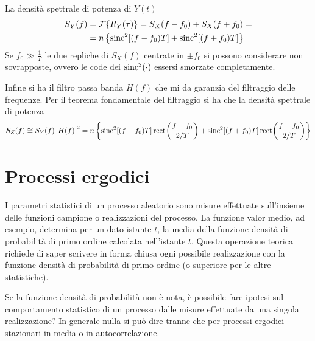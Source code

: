 La densità spettrale di potenza di $Y(t)$
\[\begin{split}S_Y(f)&=\operatorname{\mathcal{F}}\!\left\lbrace{R_Y(\tau)}\right\rbrace=S_X(f-f_0)+S_X(f+f_0)=\\&=n\left\lbrace\operatorname{sinc}^2[(f-f_0)T]+\operatorname{sinc}^2[(f+f_0)T]\right\rbrace\end{split}\]
Se $f_0\gg\frac{1}{T}$ le due repliche di $S_X(f)$ centrate in $\pm f_0$ si possono considerare non sovrapposte, ovvero le code dei $\operatorname{sinc}^2(\cdot)$ essersi smorzate completamente.

Infine si ha il filtro passa banda $H(f)$ che mi da garanzia del filtraggio delle frequenze. Per il teorema fondamentale del filtraggio si ha che la densità spettrale di potenza
\[S_Z(f)\cong S_Y(f)\left|{H(f)}\right|^2=n\left\lbrace\operatorname{sinc}^2[(f-f_0)T]\,{\operatorname{rect}}^{}\!\left({\frac{f-f_0}{2/T}}\right)+\operatorname{sinc}^2[(f+f_0)T]\,{\operatorname{rect}}^{}\!\left({\frac{f+f_0}{2/T}}\right)\right\rbrace\]

\begin{figure}[h!]
	\centering{}
\end{figure}

\section{Processi ergodici}
I parametri statistici di un processo aleatorio sono misure effettuate sull'insieme delle funzioni campione o realizzazioni del processo. La funzione valor medio, ad esempio, determina per un dato istante $t$, la media della funzione densità di probabilità di primo ordine calcolata nell'istante $t$. Questa operazione teorica richiede di saper scrivere in forma chiusa ogni possibile realizzazione con la funzione densità di probabilità di primo ordine (o superiore per le altre statistiche).

Se la funzione densità di probabilità non è nota, è possibile fare ipotesi sul comportamento statistico di un processo dalle misure effettuate da una singola realizzazione? 
In generale nulla si può dire tranne che per processi ergodici stazionari in media o in autocorrelazione.

